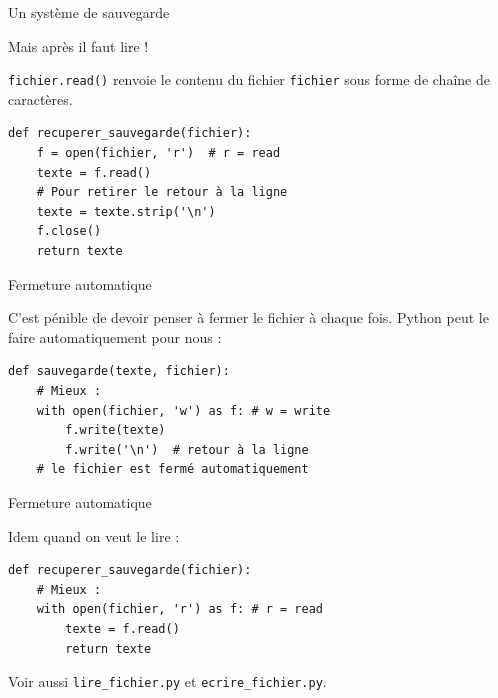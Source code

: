\documentclass[x11names,svgnames]{beamer}
\begin{document}
\begin{frame}[fragile]{Un système de sauvegarde}

  Mais après il faut lire !

  \MVRightarrow{} \texttt{fichier.read()} renvoie le contenu du fichier \texttt{fichier} sous forme de chaîne de caractères.

  \pause

  \begin{mdframed}[roundcorner=5pt]
\begin{verbatim}
def recuperer_sauvegarde(fichier):
    f = open(fichier, 'r')  # r = read
    texte = f.read()
    # Pour retirer le retour à la ligne
    texte = texte.strip('\n')
    f.close()
    return texte
\end{verbatim}
  \end{mdframed}
\end{frame}

\begin{frame}[fragile]{Fermeture automatique}

  C'est pénible de devoir penser à fermer le fichier à chaque fois. Python peut le faire automatiquement pour nous :

  \begin{mdframed}[roundcorner=5pt]
\begin{verbatim}
def sauvegarde(texte, fichier):
    # Mieux :
    with open(fichier, 'w') as f: # w = write
        f.write(texte)
        f.write('\n')  # retour à la ligne
    # le fichier est fermé automatiquement
\end{verbatim}
  \end{mdframed}

\end{frame}

\begin{frame}[fragile]{Fermeture automatique}

Idem quand on veut le lire :

  \begin{mdframed}[roundcorner=5pt]
\begin{verbatim}
def recuperer_sauvegarde(fichier):
    # Mieux :
    with open(fichier, 'r') as f: # r = read
        texte = f.read()
        return texte
\end{verbatim}
  \end{mdframed}

  \MVRightArrow{} Voir aussi \texttt{lire\_fichier.py} et \texttt{ecrire\_fichier.py}.
\end{frame}
\end{document}
